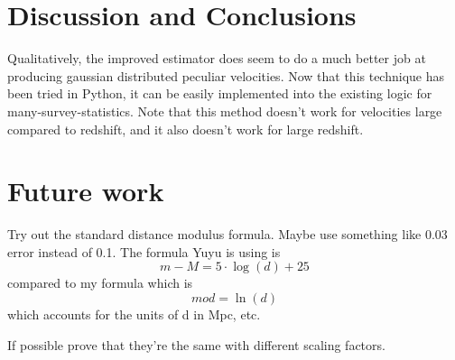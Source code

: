 \documentclass[usenatbib]{mn2e}
\begin{document}
\section{Discussion and Conclusions}

Qualitatively, the improved estimator does seem to do a much better job at producing gaussian distributed peculiar velocities. Now that this technique has been tried in Python, it can be easily implemented into the existing logic for many-survey-statistics. Note that this method doesn't work for velocities large compared to redshift, and it also doesn't work for large redshift.

\section{Future work} 
Try out the standard distance modulus formula. Maybe use something like 0.03 error instead of 0.1. The formula Yuyu is using is 
\[
m-M = 5\cdot \log\left(d\right)+25
\]
compared to my formula which is
\[
mod = \ln\left(d\right)
\]
which accounts for the units of d in Mpc, etc.

If possible prove that they're the same with different scaling factors. 


\end{document}

